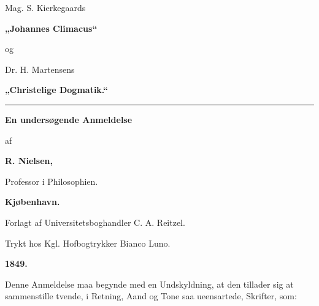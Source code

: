 \usepackage{marginnote}
\newcommand{\opage}[1]{\marginnote{\footnotesize\textit{[#1]}}}
\newcommand{\apage}[1]{\marginnote{\footnotesize\textit{[#1]}}}


\begin{titlepage}
\centering
\vspace*{2.0cm}
{\Large Mag. S. Kierkegaards\par}
\vspace{0.5cm}
{\Huge\bfseries „Johannes Climacus“\par}
\vspace{1.0cm}
{\Large og\par}
\vspace{1.0cm}
{\Large Dr. H. Martensens\par}
\vspace{0.5cm}
{\Huge\bfseries „Christelige Dogmatik.“\par}
\vspace{1.6cm}
\rule{4cm}{0.4pt}\par
\vspace{1.6cm}
{\LARGE\bfseries En undersøgende Anmeldelse\par}
\vspace{0.6cm}
{\large af\par}
\vspace{0.6cm}
{\LARGE\bfseries R. Nielsen,\par}
\vspace{0.25cm}
{\small Professor i Philosophien.\par}
\vfill
{\large\bfseries Kjøbenhavn.\par}
{\small Forlagt af Universitetsboghandler C. A. Reitzel.\par}
{\footnotesize Trykt hos Kgl. Hofbogtrykker Bianco Luno.\par}
{\large\bfseries 1849.\par}
\end{titlepage}

\frontmatter
\mainmatter
\setcounter{page}{3}


\opage{3} Denne Anmeldelse maa begynde med en Undskyldning, at den tillader
sig at sammenstille tvende, i Retning, Aand og Tone saa
ueensartede, Skrifter, som:

